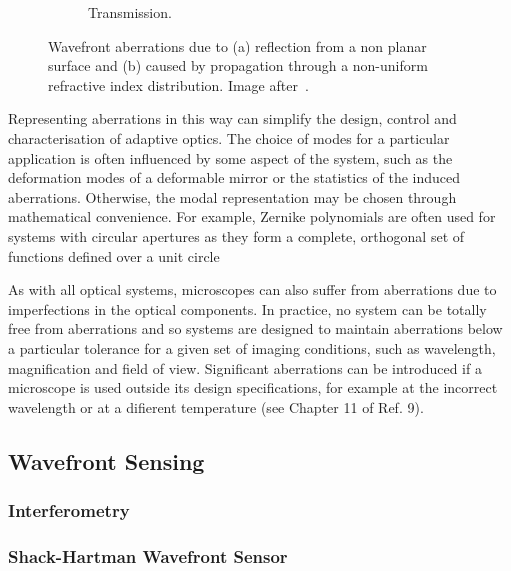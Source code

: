 \begin{figure}[tbh]
\begin{subfigure}[b]{0.3\textwidth}
                \caption{Transmission.}
                \label{fig:abberation_trans}
        \end{subfigure}
        \caption{Wavefront aberrations due to (a) reflection from a non planar surface and (b)  caused by propagation through a non-uniform refractive index distribution. Image after~\cite{Aberrations_book}.}
\label{fig:abberations}
\end{figure} 

Representing aberrations in this way can simplify the design, control and characterisation of adaptive optics. The choice of modes for a particular application is often influenced by some aspect of the system, such as the deformation modes of a deformable mirror or the statistics of the induced aberrations. Otherwise, the modal representation may be chosen through mathematical convenience. For example, Zernike polynomials are often used for systems with circular apertures as they form a complete, orthogonal set of functions defined over a unit circle

As with all optical systems, microscopes can also suffer from aberrations due to imperfections in the optical components. In practice, no system can be totally free from aberrations and so systems are designed to maintain aberrations below a particular tolerance for a given set of imaging conditions, such as wavelength, magnification and field of view. Significant aberrations can be introduced if a microscope is used outside its design specifications, for example at the incorrect wavelength or at a difierent temperature (see Chapter 11 of Ref. 9).


\subsection{Wavefront Sensing}
\label{sec:WavefrontSensing}

\subsubsection{Interferometry}
\label{sec:DirectWavefrontSensing_interferometry}

\subsubsection{Shack-Hartman Wavefront Sensor}
\label{sec:DirectWavefrontSensing_SHWS}

